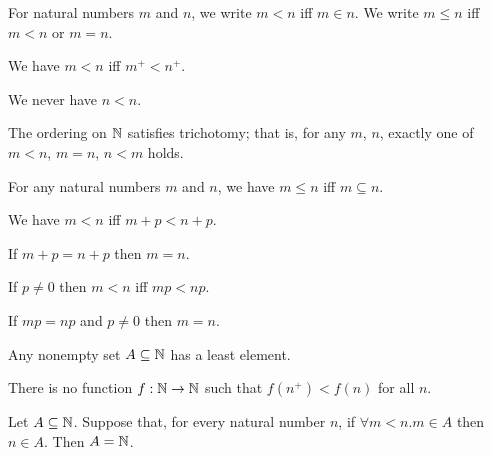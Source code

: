 \begin{definition}
    For natural numbers $m$ and $n$, we write $m < n$ iff $m \in n$.
    We write $m \leq n$ iff $m < n$ or $m = n$.
\end{definition}

\begin{theorem}
    We have $m < n$ iff $m^+ < n^+$.
\end{theorem}

\begin{theorem}
    We never have $n < n$.
\end{theorem}

\begin{theorem}
    The ordering on $\mathbb{N}$ satisfies trichotomy; that is, for any $m$, $n$,
    exactly one of $m < n$, $m = n$, $n < m$ holds.
\end{theorem}

\begin{theorem}
    For any natural numbers $m$ and $n$, we have $m \leq n$ iff $m \subseteq n$.
\end{theorem}

\begin{theorem}
    We have $m < n$ iff $m + p < n + p$.
\end{theorem}

\begin{corollary}
    If $m + p = n + p$ then $m = n$.
\end{corollary}

\begin{theorem}
    If $p \neq 0$ then $m < n$ iff $mp < np$.
\end{theorem}

\begin{corollary}
    If $mp = np$ and $p \neq 0$ then $m = n$.
\end{corollary}

\begin{theorem}
    Any nonempty set $A \subseteq \mathbb{N}$ has a least element.
\end{theorem}

\begin{corollary}
    There is no function $f : \mathbb{N} \rightarrow \mathbb{N}$ such that $f(n^+) < f(n)$
    for all $n$.
\end{corollary}

\begin{theorem}
    Let $A \subseteq \mathbb{N}$. Suppose that, for every natural number $n$,
    if $\forall m < n. m \in A$ then $n \in A$. Then $A = \mathbb{N}$.
\end{theorem}


